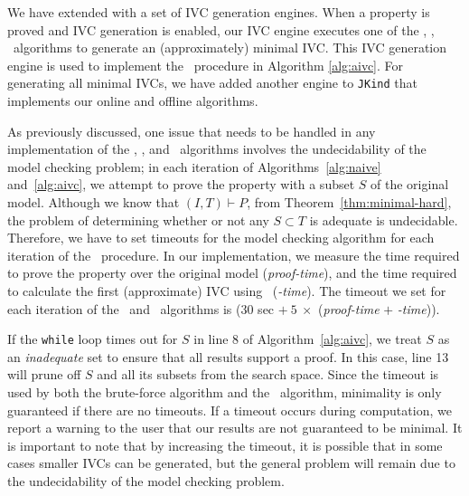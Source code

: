 We have extended \jkind with a set of IVC generation engines. When a property is
proved and IVC generation is enabled, our IVC engine
executes one of the {\ucalg, \bfalg, \ucbfalg}~algorithms \cite{Ghass16} to generate an (approximately) minimal IVC. This IVC generation engine is used to implement the \getivc\ procedure in  Algorithm \ref{alg:aivc}. For generating all minimal IVCs, we have added another engine to \texttt{JKind} that implements our online and offline algorithms.

As previously discussed, one issue that needs to
be handled in any implementation of the \ucalg, \ucbfalg, and \aivcalg~algorithms involves the undecidability of the model checking problem;
in each iteration of Algorithms~\ref{alg:naive} and~\ref{alg:aivc}, we attempt to prove the property with a subset $S$ of the original model.  Although we know that $(I, T) \vdash P$, from Theorem~\ref{thm:minimal-hard}, the problem of determining whether or not any $S \subset T$ is adequate is undecidable.
%
Therefore, we have to set timeouts for the model checking algorithm for each iteration of the \aivcalg\ procedure.
In our implementation, we measure the time required to prove the property over the original model (\emph{proof-time}), and the time required to calculate the first
(approximate) IVC using \ucalg\ (\emph{\ucalg-time}).
The timeout we set for each iteration of the \ucbfalg\ and \aivcalg\ algorithms is ($30$ sec  $+\ 5\ \times$ (\emph{proof-time} $+$ \emph{\ucalg-time})).

If the \texttt{while} loop times out for $S$ in line 8 of Algorithm~\ref{alg:aivc},
we treat $S$ as an \emph{inadequate} set to ensure that all results support a proof.
In this case, line 13 will prune off $S$ and all
its subsets from the search space.  Since the timeout is used by both the brute-force
algorithm and the \aivcalg\ algorithm, minimality is only guaranteed if there
are no timeouts.  If a timeout occurs during computation, we report a warning to the user that our results are not guaranteed to be minimal.
It is important to note that by increasing the timeout, it is possible that
in some cases smaller IVCs can be generated, but the general problem will remain due
to the undecidability of the model checking problem.

